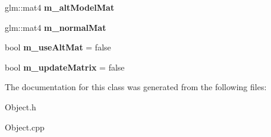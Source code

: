 \begin{DoxyCompactItemize}
\item 
\mbox{\label{class_object_aa8ca8a51906713190326b0b2667d975e}} 
glm\+::mat4 {\bfseries m\+\_\+alt\+Model\+Mat}
\item 
\mbox{\label{class_object_af542c9ba8be80682203c4fe426eb071a}} 
glm\+::mat4 {\bfseries m\+\_\+normal\+Mat}
\item 
\mbox{\label{class_object_ac7370557bcc44f3054712733de22d9ee}} 
bool {\bfseries m\+\_\+use\+Alt\+Mat} = false
\item 
\mbox{\label{class_object_a4e7183f8631f7473e648138facdee129}} 
bool {\bfseries m\+\_\+update\+Matrix} = false
\end{DoxyCompactItemize}


The documentation for this class was generated from the following files\+:\begin{DoxyCompactItemize}
\item 
Object.\+h\item 
Object.\+cpp\end{DoxyCompactItemize}

